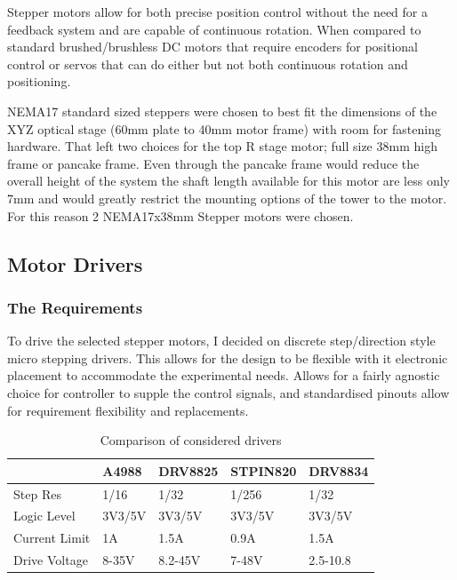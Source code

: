 Stepper motors allow for both precise position control without the need for a feedback system and are capable of continuous rotation. When compared to standard brushed/brushless DC motors that require encoders for positional control or servos that can do either but not both continuous rotation and positioning.

NEMA17 standard sized steppers were chosen to best fit the dimensions of the XYZ optical stage (60mm plate to 40mm motor frame) with room for fastening hardware. That left two choices for the top R stage motor; full size 38mm high frame or pancake frame. Even through the pancake frame would reduce the overall height of the system the shaft length available for this motor are less only 7mm and would greatly restrict the mounting options of the tower to the motor. For this reason 2 NEMA17x38mm Stepper motors were chosen. 

\newpage
\subsection{Motor Drivers}

\subsubsection*{The Requirements}
To drive the selected stepper motors, I decided on discrete step/direction style micro stepping drivers. This allows for the design to be flexible with it electronic placement to accommodate the experimental needs. Allows for a fairly agnostic choice for controller to supple the control signals, and standardised pinouts allow for requirement flexibility and replacements.

\begin{table}[h]
    \centering
    \begin{tabular}{|l|l|l|l|l|}
    \hline
    \textbf{}     & \textbf{A4988} & \textbf{DRV8825} & \textbf{STPIN820} & \textbf{DRV8834} \\ \hline
    Step Res      & 1/16           & 1/32             & 1/256             & 1/32             \\ \hline
    Logic Level   & 3V3/5V         & 3V3/5V           & 3V3/5V            & 3V3/5V           \\ \hline
    Current Limit & 1A             & 1.5A             & 0.9A              & 1.5A             \\ \hline
    Drive Voltage & 8-35V          & 8.2-45V          & 7-48V             & 2.5-10.8         \\ \hline
    \end{tabular}
    \caption{Comparison of considered drivers}
    \end{table}

